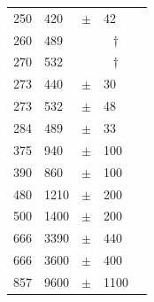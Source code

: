 \documentclass[9pt]{extarticle}   	%
\def\multic#1#2{\multicolumn{#1}{c}{#2}}
\def\dagmark{\multic{1}{$\dag$\qquad}}
\begin{document}
\begin{table}
\begin{center}
\begin{tabular}{lllll}
 250    &  420 & $\pm$ & 42    & \citet{1994AA...281..161A} \\
 260    &  489 &  & \dagmark   & \citet{1991ApJ...381..250B} \\
 270    &  532 &  & \dagmark   & \citet{1989ApJ...340L..69W} \\
 273    &  440 & $\pm$ & 30    & \citet{1990ApJ...357..606A} \\
 273    &  532 & $\pm$ & 48    & \citet{1989ApJ...340L..69W} \\
 284    &  489 & $\pm$ & 33    & \citet{1991ApJ...381..250B} \\
 375    &  940 & $\pm$ & 100   & \citet{1990ApJ...357..606A} \\
 390    &  860 & $\pm$ & 100   & \citet{1991ApJ...381..250B} \\
 480    &  1210 & $\pm$ & 200  & \citet{1991ApJ...381..250B} \\
 500    &  1400 & $\pm$ & 200  & \citet{1990ApJ...357..606A} \\
 666    &  3390 & $\pm$ & 440  & \citet{1989ApJ...340L..69W} \\
 666    &  3600 & $\pm$ & 400  & \citet{1990ApJ...357..606A} \\
 857    &  9600 & $\pm$ & 1100 & \citet{1990ApJ...357..606A} \\
  \end{tabular}
\end{center}
\label{default}
\end{table}%


\clearpage






\end{document}
